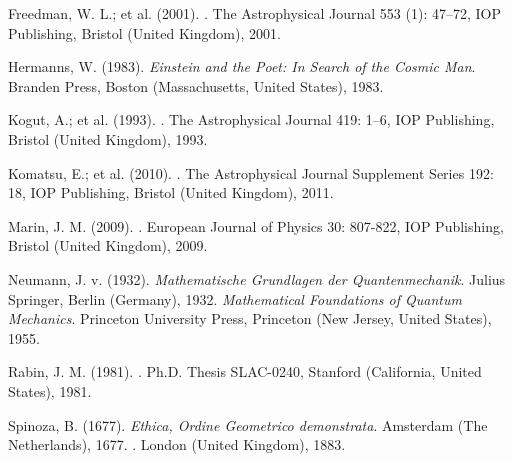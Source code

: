 \documentclass[10pt,a4paper,twoside,openany]{book}
\begin{document}
\begin{thebibliography}{99}
 Freedman, W. L.; et al. (2001). . The Astrophysical Journal 553 (1): 47–72, IOP Publishing, Bristol (United Kingdom), 2001.

 Hermanns, W. (1983). \textit{Einstein and the Poet: In Search of the Cosmic Man}. Branden Press, Boston (Massachusetts, United States), 1983.

 Kogut, A.; et al. (1993). . The Astrophysical Journal 419: 1–6, IOP Publishing, Bristol (United Kingdom), 1993.

 Komatsu, E.; et al. (2010). . The Astrophysical Journal Supplement Series 192: 18, IOP Publishing, Bristol (United Kingdom), 2011.

 Marin, J. M. (2009). . European Journal of Physics 30: 807-822, IOP Publishing, Bristol (United Kingdom), 2009.

 Neumann, J. v. (1932). \textit{Mathematische Grundlagen der Quantenmechanik}. Julius Springer, Berlin (Germany), 1932. \textit{Mathematical Foundations of Quantum Mechanics}. Princeton University Press, Princeton (New Jersey, United States), 1955.

 Rabin, J. M. (1981). . Ph.D. Thesis SLAC-0240, Stanford (California, United States), 1981.

 Spinoza, B. (1677). \textit{Ethica, Ordine Geometrico demonstrata}. Amsterdam (The Netherlands), 1677. . London (United Kingdom), 1883.

\end{thebibliography}

\end{document}
